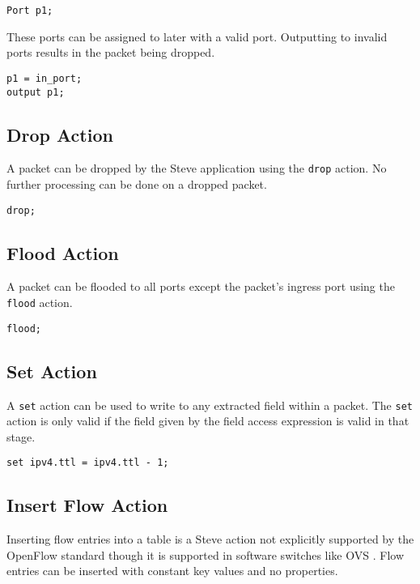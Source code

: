 \begin{lstlisting}
Port p1;
\end{lstlisting}

These ports can be assigned to later with a valid port. Outputting to invalid ports results in the packet being dropped.

\begin{lstlisting}
p1 = in_port;
output p1;
\end{lstlisting}

\subsection{Drop Action} \label{tut:drop_action}

A packet can be dropped by the Steve application using the \texttt{drop} action. No further processing can be done on a dropped packet.

\begin{lstlisting}
drop;
\end{lstlisting}

\subsection{Flood Action} \label{tut:flood_action}

A packet can be flooded to all ports except the packet's ingress port using the \texttt{flood} action.

\begin{lstlisting}
flood;
\end{lstlisting}

\subsection{Set Action} \label{tut:set_action}

A \texttt{set} action can be used to write to any extracted field within a packet. The \texttt{set} action is only valid if the field given by the field access expression is valid in that stage.

\begin{lstlisting}
set ipv4.ttl = ipv4.ttl - 1;
\end{lstlisting}

\subsection{Insert Flow Action} \label{tut:insert_flow_action}

Inserting flow entries into a table is a Steve action not explicitly supported by the OpenFlow standard \cite{openflow_spec} though it is supported in software switches like OVS \cite{ovs_man_page}. Flow entries can be inserted with constant key values and no properties. 

